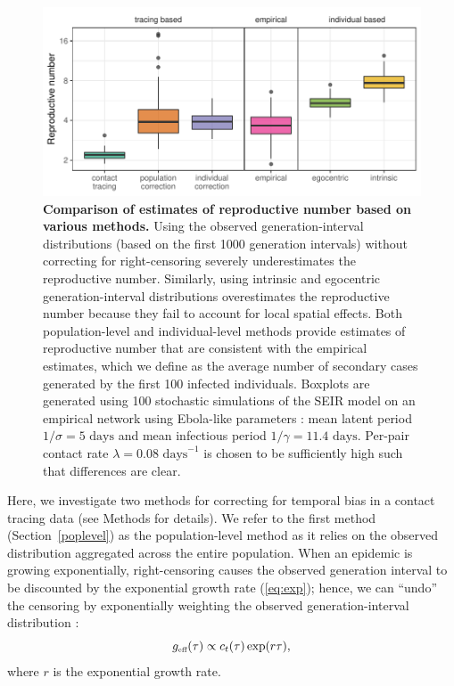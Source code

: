 \documentclass[12pt]{article}
\newcommand{\eref}[1]{(\ref{eq:#1})}
\newcommand{\tsub}[2]{#1_{{\textrm{\tiny #2}}}}
\begin{document}
\begin{figure}[!pbth]
\includegraphics[width=\textwidth]{../fig/cmp_reproductive.pdf}
\caption{\textbf{Comparison of estimates of reproductive number based on various methods.}
Using the observed generation-interval distributions (based on the first 1000 generation intervals) without correcting for right-censoring severely underestimates the reproductive number.
Similarly, using intrinsic and egocentric generation-interval distributions overestimates the reproductive number because they fail to account for local spatial effects.
Both population-level and individual-level methods provide estimates of reproductive number that are consistent with the empirical estimates, which we define as the average number of secondary cases generated by the first 100 infected individuals.
Boxplots are generated using 100 stochastic simulations of the SEIR model on an empirical network using Ebola-like parameters \citep{who2014ebola}: mean latent period $1/\sigma = 5 \textrm{ days}$ and mean infectious period $1/\gamma = 11.4 \textrm{ days}$. 
Per-pair contact rate $\lambda = 0.08 \textrm{ days}^{-1}$ is chosen to be sufficiently high such that differences are clear.
}
\label{fig:cmp}
\end{figure}

Here, we investigate two methods for correcting for temporal bias in a contact tracing data (see Methods for details).
We refer to the first method (Section~\ref{poplevel}) as the population-level method as it relies on the observed distribution aggregated across the entire population.
When an epidemic is growing exponentially, right-censoring causes the observed generation interval to be discounted by the exponential growth rate \eref{exp};
hence, we can ``undo'' the censoring by exponentially weighting the observed generation-interval distribution \citep{tomba2010some, nishiura2010time, britton2019estimation}:
\begin{equation}
\tsub{g}{eff}(\tau) \propto c_t(\tau) \exp(r\tau),
\label{eq:geff}
\end{equation}
where $r$ is the exponential growth rate.
\end{document}
